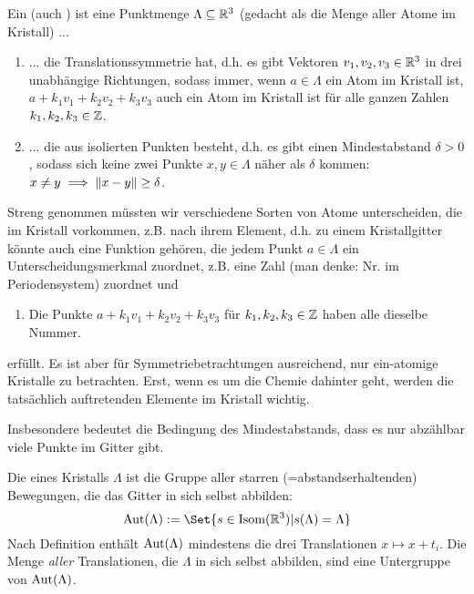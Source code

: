 
\begin{definition}[Kristalle]
Ein  (auch ) ist eine Punktmenge $\Lambda\subseteq\mathbb{R}^3$ (gedacht als die Menge aller Atome im Kristall) ...
\begin{enumerate}
\item ... die Translationssymmetrie hat, d.h. es gibt Vektoren $v_1,v_2,v_3\in\mathbb{R}^3$ in drei unabhängige Richtungen, sodass immer, wenn $a\in\Lambda$ ein Atom im Kristall ist, $a+k_1v_1+k_2v_2+k_3v_3$ auch ein Atom im Kristall ist für alle ganzen Zahlen $k_1,k_2,k_3\in\mathbb{Z}$.
\item ... die aus isolierten Punkten besteht, d.h. es gibt einen Mindestabstand $\delta>0$, sodass sich keine zwei Punkte $x,y\in\Lambda$ näher als $\delta$ kommen: $x\neq y \implies\lVert x-y\rVert\geq\delta$.
\end{enumerate}
Streng genommen müssten wir verschiedene Sorten von Atome unterscheiden, die im Kristall vorkommen, z.B. nach ihrem Element, d.h. zu einem Kristallgitter könnte auch eine Funktion gehören, die jedem Punkt $a\in\Lambda$ ein Unterscheidungsmerkmal zuordnet, z.B. eine Zahl (man denke: Nr. im Periodensystem) zuordnet und
\begin{enumerate}[resume]
\item Die Punkte $a+k_1v_1+k_2v_2+k_3v_3$ für $k_1,k_2,k_3\in\mathbb{Z}$ haben alle dieselbe Nummer.
\end{enumerate}
erfüllt. Es ist aber für Symmetriebetrachtungen ausreichend, nur ein-atomige Kristalle zu betrachten. Erst, wenn es um die Chemie dahinter geht, werden die tatsächlich auftretenden Elemente im Kristall wichtig.
\end{definition}

\begin{remark}
Insbesondere bedeutet die Bedingung des Mindestabstands, dass es nur abzählbar viele Punkte im Gitter gibt.
\end{remark}

\begin{definition}
Die  eines Kristalls $\Lambda$ ist die Gruppe aller starren (=abstandserhaltenden) Bewegungen, die das Gitter in sich selbst abbilden:
\[\Aut(\Lambda) := \Set{s\in \operatorname{Isom}(\IR^3) | s(\Lambda)=\Lambda}\]
Nach Definition enthält $\operatorname{Aut}(\Lambda)$ mindestens die drei Translationen $x\mapsto x+t_i$. Die Menge \emph{aller} Translationen, die $\Lambda$ in sich selbst abbilden, sind eine Untergruppe von $\operatorname{Aut}(\Lambda)$.
\end{definition}

